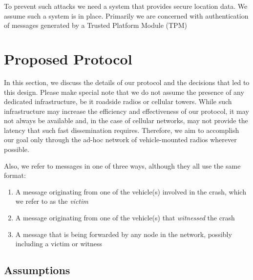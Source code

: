 \documentclass{IEEEtran}
\begin{document}
To prevent such attacks we need a system that provides secure location data. We assume such a system is in place. Primarily we are concerned with authentication of messages generated by a Trusted Platform Module (TPM)

\section{Proposed Protocol}

In this section, we discuss the details of our protocol and the decisions that led to this design.
Please make special note that we do not assume the presence of any dedicated infrastructure, be it roadside radios or cellular towers.
While such infrastructure may increase the efficiency and effectiveness of our protocol, it may not always be available and, in the case of cellular networks, may not provide the latency that such fast dissemination requires.
Therefore, we aim to accomplish our goal only through the ad-hoc network of vehicle-mounted radios wherever possible.

Also, we refer to messages in one of three ways, although they all use the same format:

\begin{enumerate}
  \item A message originating from one of the vehicle(s) involved in the crash, which we refer to as the \emph{victim}
  \item A message originating from one of the vehicle(s) that \emph{witnessed} the crash
  \item A message that is being forwarded by any node in the network, possibly including a victim or witness
\end{enumerate}


\subsection{Assumptions}
\end{document}
